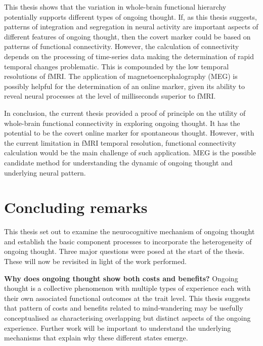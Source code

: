 This thesis shows that the variation in whole-brain functional hierarchy potentially supports different types of ongoing thought. If, as this thesis suggests, patterns of integration and segregation in neural activity are important aspects of different features of ongoing thought, then the covert marker could be based on patterns of functional connectivity. However, the calculation of connectivity depends on the processing of time-series data making the determination of rapid temporal changes problematic. This is compounded by the low temporal resolutions of fMRI. The application of magnetoencephalography (MEG) is possibly helpful for the determination of an online marker, given its ability to reveal neural processes at the level of milliseconds superior to fMRI.

In conclusion, the current thesis provided a proof of principle on the utility of whole-brain functional connectivity in exploring ongoing thought. It has the potential to be the covert online marker for spontaneous thought. However, with the current limitation in fMRI temporal resolution, functional connectivity calculation would be the main challenge of such application. MEG is the possible candidate method for understanding the dynamic of ongoing thought and underlying neural pattern.



\section{Concluding remarks}
\label{ch:discussion:summary}

This thesis set out to examine the neurocognitive mechanism of ongoing thought and establish the basic component processes to incorporate the heterogeneity of ongoing thought. Three major questions were posed at the start of the thesis. These will now be revisited in light of the work performed.

\textbf{Why does ongoing thought show both costs and benefits?} Ongoing thought is a collective phenomenon with multiple types of experience each with their own associated functional outcomes at the trait level. This thesis suggests that pattern of costs and benefits related to mind-wandering may be usefully conceptualised as characterising overlapping but distinct aspects of the ongoing experience. Further work will be important to understand the underlying mechanisms that explain why these different states emerge.


